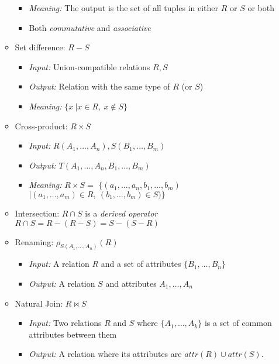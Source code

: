 \documentclass[landscape,8pt]{extarticle}
\begin{document}
\begin{multicols}{4}
\begin{itemize}
\begin{itemize}
\begin{itemize}
                \item \emph{Meaning:} The output is the set of all tuples in either $R$ or $S$ or
                both
                \item Both \emph{commutative} and \emph{associative}
            \end{itemize}
            \item Set difference: $R - S$
            \begin{itemize}
                \item \emph{Input:} Union-compatible relations $R,S$
                \item \emph{Output:} Relation with the same type of $R$ (or $S$)
                \item \emph{Meaning:} $\{x\ | x \in R,\ x \notin S\}$
            \end{itemize}
            \item Cross-product: $R \times S$
            \begin{itemize}
                \item \emph{Input:} $R(A_1, \dots, A_n), S(B_1, \dots, B_m)$
                \item \emph{Output:} $T(A_1, \dots, A_n, B_1, \dots, B_m)$
                \item \emph{Meaning:} $R \times S =$ $ \{(a_1, \dots, a_n, b_1, \dots, b_m) $ $| (a_1,
                \dots, a_m) \in R,\ (b_1, \dots, b_m) \in S) \}$
            \end{itemize}
            \item Intersection: $R \cap S$ is a \emph{derived operator} \\
            $R \cap S = R - (R - S) = S - (S - R)$
        \item Renaming: $\rho_{S(A_1, \dots, A_n)}(R)$
        \begin{itemize}
            \item \emph{Input:} A relation $R$ and a set of attributes $\{B_1, \dots, B_n\}$
            \item \emph{Output:} A relation $S$ and attributes $A_1, \dots, A_n$
        \end{itemize}
        \item Natural Join: $R \bowtie S$
        \begin{itemize}
            \item \emph{Input:} Two relations $R$ and $S$ where $\{A_1, \dots, A_k\}$ is a set of
            common attributes between them
            \item \emph{Output:} A relation where its attributes are $attr(R) \cup attr(S)$.

\end{itemize}
\end{itemize}
\end{itemize}
\end{multicols}
\end{document}
